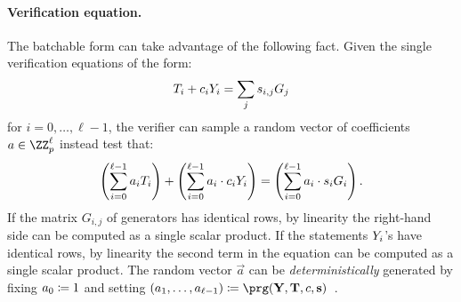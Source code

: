 \documentclass[runningheads,11pt]{article}
\begin{document}
\paragraph{Verification equation.}
The batchable form can take advantage of the following fact.
Given the single verification equations of the form:
\[
   T_i + c_i Y_i = \sum_j s_{i, j} G_j
\]
for $i=0, \dots,\ell-1$,
the verifier can sample a random vector of coefficients $a \in \ZZ_p^\ell$ instead test that:
\[
  \left(\sum_{i=0}^{\ell-1} a_i T_i\right) + \left(\sum_{i=0}^{\ell-1} a_i \cdot  c_i Y_i \right) = \left(\sum_{i=0}^{\ell-1} a_i \cdot s_i G_i\right).
\]
If the matrix $G_{i, j}$ of generators has identical rows, by linearity the right-hand side can be computed as a single scalar product.
If the statements $Y_i$'s have identical rows, by linearity the second term in the equation can be computed as a single scalar product.
The random vector $\vec a$ can be \emph{deterministically} generated by fixing $a_0 \coloneqq 1$ and setting $(a_1, \dots, a_{\ell-1}) \defeq \prg(\vec Y, \vec T,  \challenge, \vec s)$~\cite{bip-schnorr}.
\end{document}
